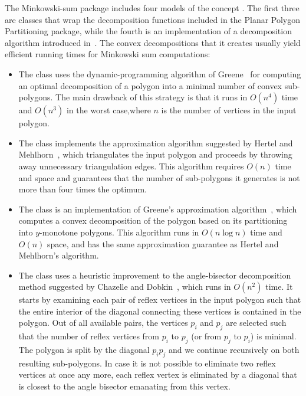 The Minkowski-sum package includes four models of the concept
. The first three are classes that wrap
the decomposition functions included in the Planar Polygon Partitioning
package, while the fourth is an implementation of a decomposition algorithm
introduced in~\cite{cgal:afh-pdecm-02}. The convex decompositions that it
creates usually yield efficient running times for Minkowski sum computations:
\begin{itemize}
\item
The class  uses the
dynamic-programming algorithm of Greene~\cite{g-dpcp-83} for computing an
optimal decomposition of a polygon into a minimal number of convex
sub-polygons. The main drawback of this strategy is that it runs in $O(n^4)$
time and $O(n^3)$ in the worst case,where $n$ is the number of vertices in
the input polygon.
%
\item
The class  implements the
approximation algorithm suggested by Hertel and Mehlhorn~\cite{hm-ftsp-83},
which triangulates the input polygon and proceeds by throwing away
unnecessary triangulation edges.
This algorithm requires $O(n)$ time and space and guarantees that
the number of sub-polygons it generates is not more than four
times the optimum.
%
\item
The class  is an implementation of
Greene's approximation algorithm~\cite{g-dpcp-83}, which computes a
convex decomposition of the polygon based on its partitioning into
$y$-monotone polygons. This algorithm runs in $O(n \log n)$ time
and $O(n)$ space, and has the same approximation guarantee as
Hertel and Mehlhorn's algorithm.
%
\item
The class  uses
a heuristic improvement to the angle-bisector decomposition method
suggested by Chazelle and Dobkin~\cite{cd-ocd-85}, which runs in
$O(n^2)$ time. It starts by examining each pair of reflex vertices
in the input polygon such that the entire interior of the diagonal
connecting these vertices is contained in the polygon. Out of all
available pairs, the vertices $p_i$ and $p_j$ are selected such
that the number of reflex vertices from $p_i$ to $p_j$ (or from
$p_j$ to $p_i$) is minimal. The polygon is split by the diagonal
$p_i p_j$ and we continue recursively on both resulting
sub-polygons. In case it is not possible to eliminate two reflex
vertices at once any more, each reflex vertex is eliminated by a
diagonal that is closest to the angle bisector emanating from this
vertex.
\end{itemize}


